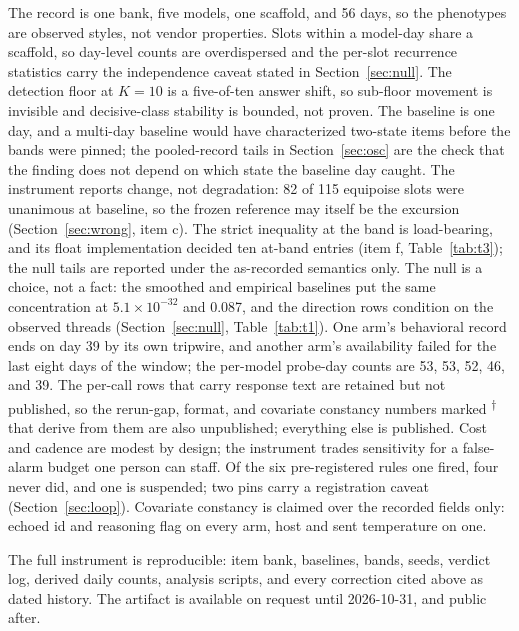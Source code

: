 \documentclass[conference]{IEEEtran}
\newcommand{\rows}{\textsuperscript{$\dagger$}}
\begin{document}
The record is one bank, five models, one scaffold, and 56 days, so the
phenotypes are observed styles, not vendor properties. Slots within a
model-day share a scaffold, so day-level counts are overdispersed and
the per-slot recurrence statistics carry the independence caveat
stated in Section~\ref{sec:null}. The detection floor at $K{=}10$ is a
five-of-ten answer shift, so sub-floor movement is invisible and
decisive-class stability is bounded, not proven. The baseline is one
day, and a multi-day baseline would have characterized two-state items
before the bands were pinned; the pooled-record tails in
Section~\ref{sec:osc} are the check that the finding does not depend
on which state the baseline day caught. The instrument reports change,
not degradation: 82 of 115 equipoise slots were unanimous at baseline,
so the frozen reference may itself be the excursion
(Section~\ref{sec:wrong}, item c). The strict inequality at the band
is load-bearing, and its float implementation decided ten at-band
entries (item f, Table~\ref{tab:t3}); the null tails are reported
under the as-recorded semantics only. The null is a choice, not a
fact: the smoothed and empirical baselines put the same concentration
at $5.1\times10^{-32}$ and 0.087, and the direction rows condition on
the observed threads (Section~\ref{sec:null}, Table~\ref{tab:t1}). One
arm's behavioral record ends on day 39 by its own tripwire, and
another arm's availability failed for the last eight days of the
window; the per-model probe-day counts are 53, 53, 52, 46, and 39. The
per-call rows that carry response text are retained but not published,
so the rerun-gap, format, and covariate constancy numbers marked \rows
that derive from them are also unpublished; everything else is
published. Cost and cadence are modest by design; the instrument
trades sensitivity for a false-alarm budget one person can staff. Of
the six pre-registered rules one fired, four never did, and one is
suspended; two pins carry a registration caveat
(Section~\ref{sec:loop}). Covariate constancy is claimed over the
recorded fields only: echoed id and reasoning flag on every arm, host
and sent temperature on one.

The full instrument is reproducible: item bank, baselines, bands,
seeds, verdict log, derived daily counts, analysis scripts, and every
correction cited above as dated history. The artifact is available on request until 2026-10-31, and
public after.



\end{document}
